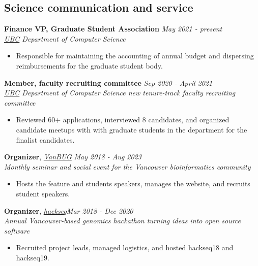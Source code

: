 \documentclass[margin]{res}
\begin{document}
\begin{resume}
\section{Science communication and service}
    	\textbf{Finance VP, Graduate Student Association}    \hfill \textit{May 2021 - present} \\
	    \textit{\href{https://www.cs.ubc.ca/}{\textit{UBC}} Department of Computer Science }\\
    \vspace{-1em}
    \begin{itemize}[leftmargin=*]
	    \item Responsible for maintaining the accounting of annual budget and dispersing reimbursements for the graduate student body.
	\end{itemize}
 
    	\textbf{Member, faculty recruiting committee}    \hfill \textit{Sep 2020 - April 2021} \\
	    \textit{\href{https://www.cs.ubc.ca/}{\textit{UBC}} Department of Computer Science new tenure-track faculty recruiting committee}\\
    \vspace{-1em}
    \begin{itemize}[leftmargin=*]
	    \item Reviewed 60+ applications, interviewed 8 candidates, and organized candidate meetups with with graduate students in the department for the finalist candidates.
	\end{itemize}
    	
    	

    	\textbf{Organizer}, \textit{\href{http://www.vanbug.org/}{VanBUG}}  \hfill \textit{May 2018 - Aug 2023} \\
    	\textit{Monthly seminar and social event for the Vancouver bioinformatics community} \\ 
    \vspace{-1em}
    \begin{itemize}[leftmargin=*]
	    \item Hosts the feature and students speakers, manages the website, and recruits student speakers.
	\end{itemize}
        

    	\textbf{Organizer}, \href{https://www.hackseq.com}{\textit{hackseq}}\hfill \textit{Mar 2018 - Dec 2020} \\
    	\textit{Annual Vancouver-based genomics hackathon turning ideas into open source software}\\
    \vspace{-1em}
    \begin{itemize}[leftmargin=*]
    	\item Recruited project leads, managed logistics, and hosted hackseq18 and hackseq19.
	\end{itemize}
    	


\end{resume}
\end{document}
